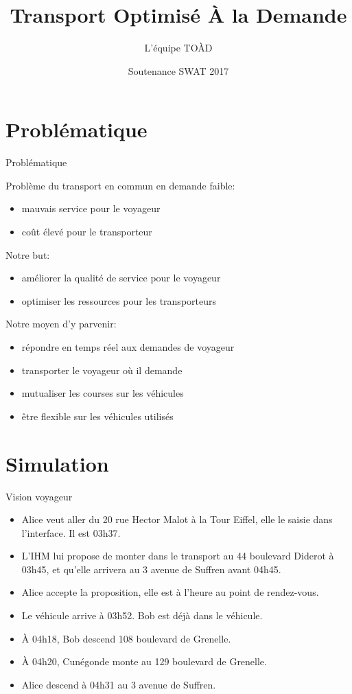 \documentclass[table]{beamer}
\title{Transport Optimisé À la Demande}
\author{L'équipe TOÀD}
\institute[Kisio Digital] %
{
  Kisio Digital\\
  20 rue Hector Malot\\
  75012 Paris, France}
\date{Soutenance SWAT 2017}
\begin{document}
\begin{frame}
  \titlepage
\end{frame}

\section{Problématique}

\begin{frame}{Problématique}

  Problème du transport en commun en demande faible:
  \begin{itemize}
  \item mauvais service pour le voyageur
  \item coût élevé pour le transporteur
  \end{itemize}

  Notre but:
  \begin{itemize}
  \item améliorer la qualité de service pour le voyageur
  \item optimiser les ressources pour les transporteurs
  \end{itemize}

  Notre moyen d'y parvenir:
  \begin{itemize}
  \item répondre en temps réel aux demandes de voyageur
  \item transporter le voyageur où il demande
  \item mutualiser les courses sur les véhicules
  \item être flexible sur les véhicules utilisés
  \end{itemize}
\end{frame}

\section{Simulation}

\begin{frame}{Vision voyageur}

  \begin{itemize}[<+->]
  \item Alice veut aller du 20 rue Hector Malot à la Tour Eiffel, elle
    le saisie dans l'interface. Il est 03h37.
  \item L'IHM lui propose de monter dans le transport au 44 boulevard
    Diderot à 03h45, et qu'elle arrivera au 3 avenue de Suffren avant
    04h45.
  \item Alice accepte la proposition, elle est à l'heure au point de
    rendez-vous.
  \item Le véhicule arrive à 03h52. Bob est déjà dans le véhicule.
  \item À 04h18, Bob descend 108 boulevard de Grenelle.
  \item À 04h20, Cunégonde monte au 129 boulevard de Grenelle.
  \item Alice descend à 04h31 au 3 avenue de Suffren.
  \end{itemize}
\end{frame}
\end{document}
